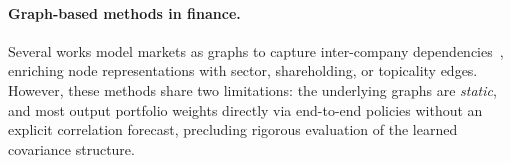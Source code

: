 \documentclass[runningheads]{llncs}
\begin{document}


\paragraph{Graph-based methods in finance.}
Several works model markets as graphs to capture inter-company dependencies~\cite{wang2019alphastock,feng2019temporal,kim2019hatshierarchicalgraphattention,ye2020multi,soleymani2021deeppocket,shi2022gpm}, enriching node representations with sector, shareholding, or topicality edges. However, these methods share two limitations: the underlying graphs are \emph{static}, and most output portfolio weights directly via end-to-end policies without an explicit correlation forecast, precluding rigorous evaluation of the learned covariance structure.
\end{document}
